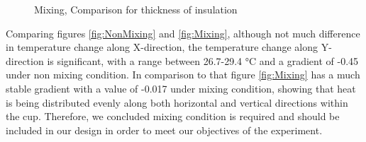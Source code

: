 \begin{figure}[h] %
    \begin{minipage}{0.45\textwidth}
        \centering
    \end{minipage}
    \begin{minipage}{0.45\textwidth}
        \centering
    \end{minipage}
    \caption{Mixing, Comparison for thickness of insulation}
	\label{fig:WithoutInsulationComparison}
\end{figure}

Comparing figures \ref{fig:NonMixing} and \ref{fig:Mixing}, although not much difference in temperature change along X-direction, the temperature change along Y-direction is significant, with a range between 26.7-29.4 \si{\celsius} and a gradient of -0.45 under non mixing condition. In comparison to that figure \ref{fig:Mixing} has a much stable gradient with a value of -0.017 under mixing condition, showing that heat is being distributed evenly along both horizontal and vertical directions within the cup. Therefore, we concluded mixing condition is required and should be included in our design in order to meet our objectives of the experiment.  

